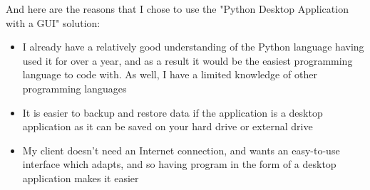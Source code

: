 And here are the reasons that I chose to use the "Python Desktop Application with a GUI" solution:

\begin{itemize}
\item I already have a relatively good understanding of the Python language having used it for over a year, and as a result it would be the easiest programming language to code with. As well, I have a limited knowledge of other programming languages
\item It is easier to backup and restore data if the application is a desktop application as it can be saved on your hard drive or external drive
\item My client doesn't need an Internet connection, and wants an easy-to-use interface which adapts, and so having program in the form of a desktop application makes it easier
\end{itemize}